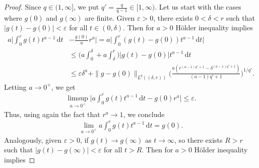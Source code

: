 \documentclass[12pt, reqno]{amsart}%
\theoremstyle{plain}  %
\theoremstyle{definition}  %
\theoremstyle{remark}
\numberwithin{equation}{section}
\renewcommand{\d}{\,\mathrm{d}}
\newcommand{\eps}{\varepsilon}
\begin{document}
\begin{proof}
Since $q\in (1,\infty]$, we put $q'= \frac{q}{q-1}\in [1,\infty)$.  Let us start with the cases where $g(0)$ and $g(\infty)$ are finite.  
Given $\varepsilon > 0$, there exists $0 < \delta < r$ such that $|g(t) - g(0)| < \varepsilon$ for all $ t \in (0, \delta).
$   Then for $a>0$ H\"older inequality implies
\begin{align*}
a\Big|\int_0^r g(t)t^{a-1} \d t &- \frac{g(0)}{a} r^{a} \Big|
= a \Big|\int_0^r (g(t) - g(0)) t^{a-1} \d t \Big|\\
&\leq \Big(a \int_0^\delta + a \int_\delta^r \Big)|g(t) - g(0)| t^{a-1} \d t \\
&\leq \varepsilon \delta^a + \|g-g(0)\|_{L^q( (\delta,r))}
\Big(\frac{a(r^{(a-1)q'+1} - \delta^{(a-1)q'+1})}{(a-1)q'+1}\Big)^{1/q'}.
\end{align*}
Letting $a \to 0^+$, we get
\begin{align*}
\limsup_{a \to 0^+} \Big|a\int_0^r g(t)t^{a-1} \d t - g(0)r^a \Big|\leq \varepsilon.
\end{align*}
Thus, using again the fact that $r^a \to 1$, we conclude
\begin{align*}
\lim_{a\to0^+} a\int_0^r g(t)t^{a-1}\d t = g(0).
\end{align*}
Analogously, given $\varepsilon > 0$, if  $ g(t) \to g(\infty)$ as $t\to\infty$, so there exists $R > r$ such that
$|g(t) - g(\infty)| < \eps$  for all  $t > R.$ Then for $a>0$ H\"older inequality implies


\end{proof}
\end{document}
